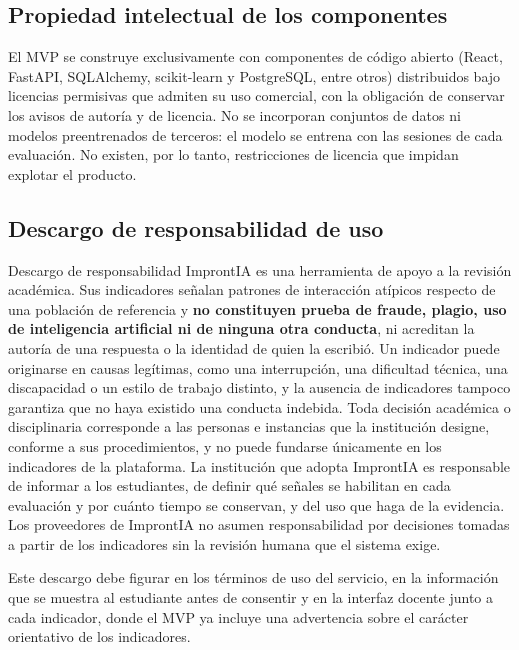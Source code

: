 \subsection{Propiedad intelectual de los componentes}

El MVP se construye exclusivamente con componentes de código abierto (React, FastAPI, SQLAlchemy, scikit-learn y PostgreSQL, entre otros) distribuidos bajo licencias permisivas que admiten su uso comercial, con la obligación de conservar los avisos de autoría y de licencia. No se incorporan conjuntos de datos ni modelos preentrenados de terceros: el modelo se entrena con las sesiones de cada evaluación. No existen, por lo tanto, restricciones de licencia que impidan explotar el producto.

\subsection{Descargo de responsabilidad de uso}

\begin{keyfinding}{Descargo de responsabilidad}
ImprontIA es una herramienta de apoyo a la revisión académica. Sus indicadores señalan patrones de interacción atípicos respecto de una población de referencia y \textbf{no constituyen prueba de fraude, plagio, uso de inteligencia artificial ni de ninguna otra conducta}, ni acreditan la autoría de una respuesta o la identidad de quien la escribió. Un indicador puede originarse en causas legítimas, como una interrupción, una dificultad técnica, una discapacidad o un estilo de trabajo distinto, y la ausencia de indicadores tampoco garantiza que no haya existido una conducta indebida. Toda decisión académica o disciplinaria corresponde a las personas e instancias que la institución designe, conforme a sus procedimientos, y no puede fundarse únicamente en los indicadores de la plataforma. La institución que adopta ImprontIA es responsable de informar a los estudiantes, de definir qué señales se habilitan en cada evaluación y por cuánto tiempo se conservan, y del uso que haga de la evidencia. Los proveedores de ImprontIA no asumen responsabilidad por decisiones tomadas a partir de los indicadores sin la revisión humana que el sistema exige.
\end{keyfinding}

Este descargo debe figurar en los términos de uso del servicio, en la información que se muestra al estudiante antes de consentir y en la interfaz docente junto a cada indicador, donde el MVP ya incluye una advertencia sobre el carácter orientativo de los indicadores.


